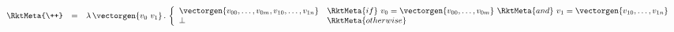 \[
  \begin{array}{r l l}
    \RktMeta{\++} & = & \lambda\,\vectorgen{v_0~v_1}\,.\,
                          \left\{\begin{array}{l l}
                            \vectorgen{v_{00}, \ldots, v_{0m}, v_{10}, \ldots, v_{1n}}
                            & \RktMeta{if}~v_0 = \vectorgen{v_{00}, \ldots, v_{0m}}
                              ~\RktMeta{and}~v_1 = \vectorgen{v_{10}, \ldots, v_{1n}}
                          \\\bot & \RktMeta{otherwise}
                          \end{array}\right.
  \end{array}
\]
